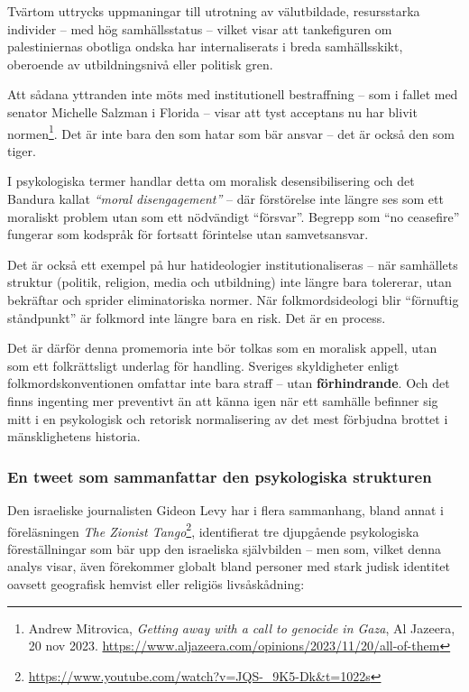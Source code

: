 Tvärtom uttrycks uppmaningar till utrotning av välutbildade, resursstarka individer – med hög samhällsstatus – vilket visar att tankefiguren om palestiniernas obotliga ondska har internaliserats i breda samhällsskikt, oberoende av utbildningsnivå eller politisk gren.

Att sådana yttranden inte möts med institutionell bestraffning – som i fallet med senator Michelle Salzman i Florida – visar att tyst acceptans nu har blivit normen\footnote{Andrew Mitrovica, \textit{Getting away with a call to genocide in Gaza}, Al Jazeera, 20 nov 2023. \url{https://www.aljazeera.com/opinions/2023/11/20/all-of-them}}. Det är inte bara den som hatar som bär ansvar – det är också den som tiger.

I psykologiska termer handlar detta om moralisk desensibilisering och det Bandura kallat \textit{“moral disengagement”} – där förstörelse inte längre ses som ett moraliskt problem utan som ett nödvändigt “försvar”. Begrepp som “no ceasefire” fungerar som kodspråk för fortsatt förintelse utan samvetsansvar.

Det är också ett exempel på hur hatideologier institutionaliseras – när samhällets struktur (politik, religion, media och utbildning) inte längre bara tolererar, utan bekräftar och sprider eliminatoriska normer. När folkmordsideologi blir “förnuftig ståndpunkt” är folkmord inte längre bara en risk. Det är en process.

Det är därför denna promemoria inte bör tolkas som en moralisk appell, utan som ett folkrättsligt underlag för handling. Sveriges skyldigheter enligt folkmordskonventionen omfattar inte bara straff – utan \textbf{förhindrande}. Och det finns ingenting mer preventivt än att känna igen när ett samhälle befinner sig mitt i en psykologisk och retorisk normalisering av det mest förbjudna brottet i mänsklighetens historia.


\subsubsection*{En tweet som sammanfattar den psykologiska strukturen}

Den israeliske journalisten Gideon Levy har i flera sammanhang, bland annat i föreläsningen \textit{The Zionist Tango}\footnote{\url{https://www.youtube.com/watch?v=JQS-_9K5-Dk&t=1022s}}, identifierat tre djupgående psykologiska föreställningar som bär upp den israeliska självbilden – men som, vilket denna analys visar, även förekommer globalt bland personer med stark judisk identitet oavsett geografisk hemvist eller religiös livsåskådning:

